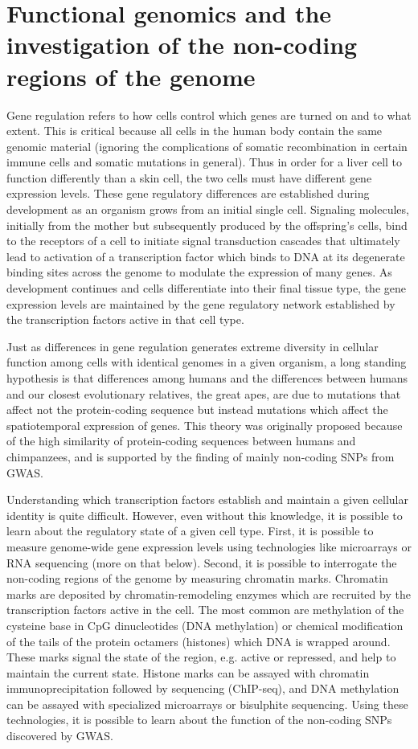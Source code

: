 \section{Functional genomics and the investigation of the non-coding regions of the genome}

Gene regulation refers to how cells control which genes are turned on
and to what extent. This is critical because all cells in the human
body contain the same genomic material (ignoring the complications of
somatic recombination in certain immune cells and somatic mutations in
general). Thus in order for a liver cell to function differently than
a skin cell, the two cells must have different gene expression
levels. These gene regulatory differences are established during
development as an organism grows from an initial single
cell. Signaling molecules, initially from the mother but subsequently
produced by the offspring’s cells, bind to the receptors of a cell to
initiate signal transduction cascades that ultimately lead to
activation of a transcription factor which binds to DNA at its
degenerate binding sites across the genome to modulate the expression
of many genes. As development continues and cells differentiate into
their final tissue type, the gene expression levels are maintained by
the gene regulatory network established by the transcription factors
active in that cell type.

Just as differences in gene regulation generates extreme diversity in
cellular function among cells with identical genomes in a given
organism, a long standing hypothesis is that differences among humans
and the differences between humans and our closest evolutionary
relatives, the great apes, are due to mutations that affect not the
protein-coding sequence but instead mutations which affect the
spatiotemporal expression of genes. This theory was originally
proposed because of the high similarity of protein-coding sequences
between humans and chimpanzees, and is supported by the finding of
mainly non-coding SNPs from GWAS.

Understanding which transcription factors establish and maintain a
given cellular identity is quite difficult. However, even without this
knowledge, it is possible to learn about the regulatory state of a
given cell type. First, it is possible to measure genome-wide gene
expression levels using technologies like microarrays or RNA
sequencing (more on that below). Second, it is possible to interrogate
the non-coding regions of the genome by measuring chromatin
marks. Chromatin marks are deposited by chromatin-remodeling enzymes
which are recruited by the transcription factors active in the
cell. The most common are methylation of the cysteine base in CpG
dinucleotides (DNA methylation) or chemical modification of the tails
of the protein octamers (histones) which DNA is wrapped around. These
marks signal the state of the region, e.g. active or repressed, and
help to maintain the current state. Histone marks can be assayed with
chromatin immunoprecipitation followed by sequencing (ChIP-seq), and
DNA methylation can be assayed with specialized microarrays or
bisulphite sequencing. Using these technologies, it is possible to
learn about the function of the non-coding SNPs discovered by GWAS.

